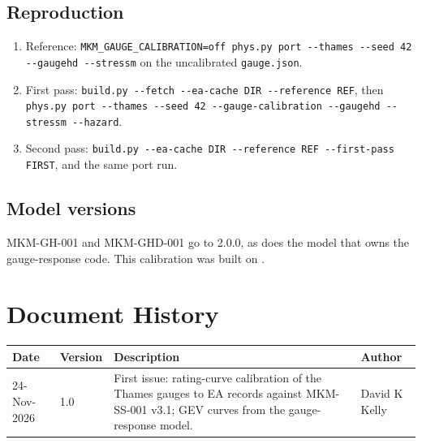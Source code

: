 \documentclass[11pt,a4paper]{article}
\renewcommand{\mkmhistorypage}[1]{%
    \section{Document History}
    \begin{table}[ht]
        \centering
        \begin{tabular}{l|l|p{9cm}|l}
            \textbf{Date} & \textbf{Version} & \textbf{Description} & \textbf{Author} \\
            \hline
            #1
        \end{tabular}
    \end{table}
}
\begin{document}
\subsection{Reproduction}\label{sec:repro}
\begin{enumerate}[nosep]
    \item Reference: \texttt{MKM\_GAUGE\_CALIBRATION=off phys.py port -{}-thames -{}-seed 42
          -{}-gaugehd -{}-stressm} on the uncalibrated \texttt{gauge.json}.
    \item First pass: \texttt{build.py -{}-fetch -{}-ea-cache DIR -{}-reference REF}, then
          \texttt{phys.py port -{}-thames -{}-seed 42 -{}-gauge-calibration -{}-gaugehd
          -{}-stressm -{}-hazard}.
    \item Second pass: \texttt{build.py -{}-ea-cache DIR -{}-reference REF -{}-first-pass
          FIRST}, and the same port run.
\end{enumerate}

\subsection{Model versions}
MKM-GH-001 and MKM-GHD-001 go to 2.0.0, as does the model that owns the gauge-response code.
This calibration was built on \gcBuilt.

\mkmhistorypage{24-Nov-2026 & 1.0 & First issue: rating-curve calibration of the Thames gauges
to EA records against MKM-SS-001 v3.1; GEV curves from the gauge-response model. & David K Kelly \\}
\end{document}
